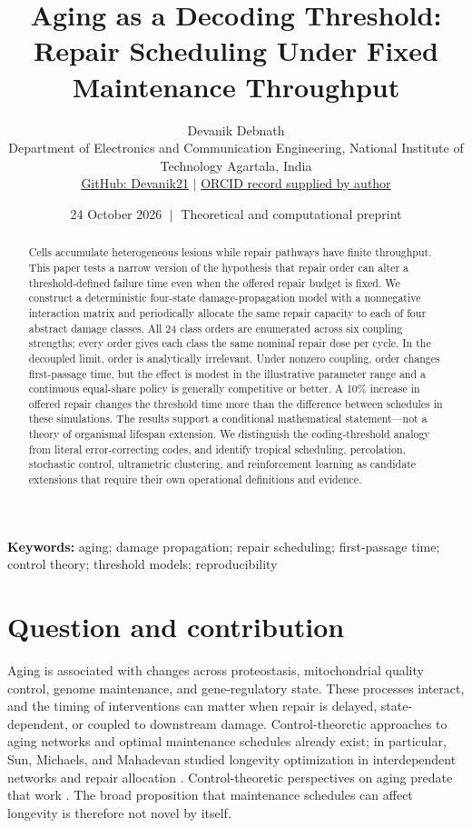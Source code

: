 \documentclass[10pt,letterpaper]{article}
\title{\vspace{-1.6em}\textbf{\color{ink}Aging as a Decoding Threshold:}\\[0.25em]\large Repair Scheduling Under Fixed Maintenance Throughput}
\author{Devanik Debnath\\\small Department of Electronics and Communication Engineering, National Institute of Technology Agartala, India\\\small \href{https://github.com/Devanik21}{GitHub: Devanik21} \; $\vert$ \; \href{https://orcid.org/0009-0001-8310-6921}{ORCID record supplied by author}}
\date{24 October 2026 $\;\vert\;$ Theoretical and computational preprint}
\begin{document}
\maketitle
\begin{abstract}
Cells accumulate heterogeneous lesions while repair pathways have finite throughput. This paper tests a narrow version of the hypothesis that repair order can alter a threshold-defined failure time even when the offered repair budget is fixed. We construct a deterministic four-state damage-propagation model with a nonnegative interaction matrix and periodically allocate the same repair capacity to each of four abstract damage classes. All 24 class orders are enumerated across six coupling strengths; every order gives each class the same nominal repair dose per cycle. In the decoupled limit, order is analytically irrelevant. Under nonzero coupling, order changes first-passage time, but the effect is modest in the illustrative parameter range and a continuous equal-share policy is generally competitive or better. A 10\% increase in offered repair changes the threshold time more than the difference between schedules in these simulations. The results support a conditional mathematical statement—not a theory of organismal lifespan extension. We distinguish the coding-threshold analogy from literal error-correcting codes, and identify tropical scheduling, percolation, stochastic control, ultrametric clustering, and reinforcement learning as candidate extensions that require their own operational definitions and evidence.
\end{abstract}
\noindent\textbf{Keywords:} aging; damage propagation; repair scheduling; first-passage time; control theory; threshold models; reproducibility

\section{Question and contribution}
Aging is associated with changes across proteostasis, mitochondrial quality control, genome maintenance, and gene-regulatory state. These processes interact, and the timing of interventions can matter when repair is delayed, state-dependent, or coupled to downstream damage. Control-theoretic approaches to aging networks and optimal maintenance schedules already exist; in particular, Sun, Michaels, and Mahadevan studied longevity optimization in interdependent networks and repair allocation \cite{Sun2020OptimalControl}. Control-theoretic perspectives on aging predate that work \cite{MurphyPartridge2008Control}. The broad proposition that maintenance schedules can affect longevity is therefore not novel by itself.
\end{document}
